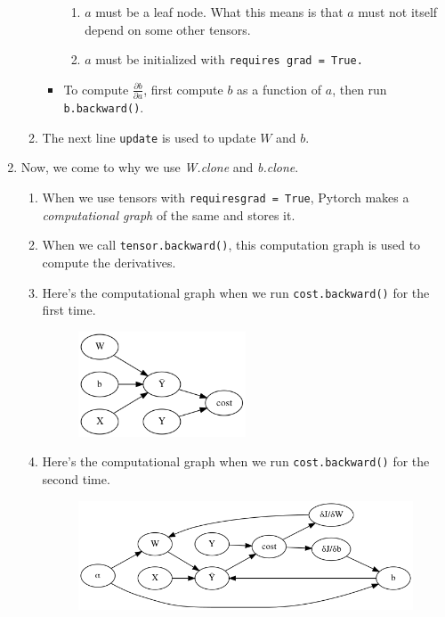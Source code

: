 \documentclass{article}
\begin{document}
\begin{enumerate}
\begin{enumerate}
\begin{itemize}
                \begin{enumerate}
                    \item $a$ must be a leaf node. What this means is that $a$ must not itself depend on some other tensors.
                    \item $a$ must be initialized with \tt{requires \textunderscore grad = True}.
                \end{enumerate}
                \item To compute $\frac{\partial{b}}{\partial{a}}$, first compute $b$ as a function of $a$, then run {\tt b.backward()}.
            \end{itemize}
            \item The next line {\tt update} is used to update $W$ and $b$.
        \end{enumerate}
        \item Now, we come to why we use \emph{W.clone} and \emph{b.clone}.
        \begin{enumerate}
            \item When we use tensors with {\tt requires\textunderscore grad = True}, Pytorch makes a \emph{computational graph} of the same and stores it.
            \item When we call {\tt tensor.backward()}, this computation graph is used to compute the derivatives.
            \item Here's the computational graph when we run {\tt cost.backward()} for the first time.
            \begin{figure}[H] \begin{center}
                \includegraphics[width = 0.5\textwidth]{graph1.png}
            \end{center} \end{figure}
            \newpage
            \item Here's the computational graph when we run {\tt cost.backward()} for the second time.
            \begin{figure}[H] \begin{center}
                \includegraphics[width = \textwidth]{graph2.png}

\end{center}
\end{figure}
\end{enumerate}
\end{enumerate}
\end{document}

